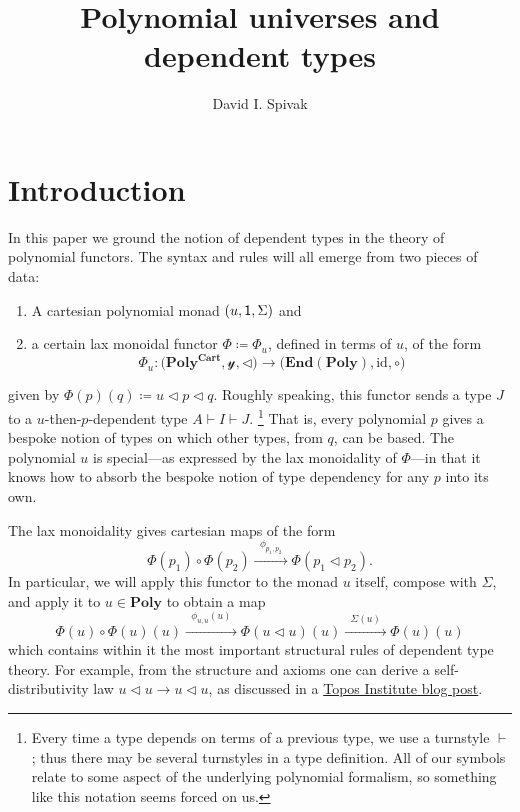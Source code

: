 \documentclass[11pt, one side, article]{memoir}
\theoremstyle{definition}
\theoremstyle{plain}
\newcommand{\Cat}[1]{\mathbf{#1}}%
\newcommand{\id}{\mathrm{id}}
\newcommand{\too}{\longrightarrow}
\newcommand{\Too}[1]{\xrightarrow{\;\;#1\;\;}}
\newcommand{\en}{\Cat{End}}
\newcommand{\yon}{\mathcal{y}}
\newcommand{\poly}{\Cat{Poly}}
\newcommand{\polycart}{\poly^{\Cat{Cart}}}
\newcommand{\0}{\textsf{0}}
\newcommand{\1}{\tn{\textsf{1}}}
\newcommand{\tri}{\mathbin{\triangleleft}}
\begin{document}
\title{Polynomial universes and dependent types}

\author{David I. Spivak}

\date{\vspace{-.2in}}

\maketitle

\begin{abstract}
\end{abstract}


\chapter{Introduction}

In this paper we ground the notion of dependent types in the theory of polynomial functors. The syntax and rules will all emerge from two pieces of data:
\begin{enumerate}
	\item A cartesian polynomial monad $(u,\1,\Sigma)$ and
	\item a certain lax monoidal functor $\Phi\coloneqq\Phi_u$, defined in terms of $u$, of the form
\begin{equation}\label{eqn.Phi}
\Phi_u\colon\Big(\polycart,\yon,\tri\Big)\too\Big(\en(\poly),\id,\circ\Big)
\end{equation}
\end{enumerate}
given by $\Phi(p)(q)\coloneqq u\tri p\tri q$. Roughly speaking, this functor sends a type $J$ to a $u$-then-$p$-dependent type $A\vdash I\vdash J$.%
\footnote{Every time a type depends on terms of a previous type, we use a turnstyle $\vdash$; thus there may be several turnstyles in a type definition. All of our symbols relate to some aspect of the underlying polynomial formalism, so something like this notation seems forced on us.
}
 That is, every polynomial $p$ gives a bespoke notion of types on which other types, from $q$, can be based. The polynomial $u$ is special---as expressed by the lax monoidality of $\Phi$---in that it knows how to absorb the bespoke notion of type dependency for any $p$ into its own. 

The lax monoidality gives cartesian maps of the form 
\[
\Phi(p_1)\circ\Phi(p_2)
\Too{\phi_{p_1,p_2}}
\Phi(p_1\tri p_2).
\]
In particular, we will apply this functor to the monad $u$ itself, compose with $\Sigma$, and apply it to $u\in\poly$ to obtain a map
\begin{equation}\label{eqn.main}
  \Phi(u)\circ\Phi(u)(u)
  \Too{\phi_{u,u}(u)}
  \Phi(u\tri u)(u)
  \Too{\Sigma(u)}
  \Phi(u)(u)
\end{equation}
which contains within it the most important structural rules of dependent type theory. For example, from the structure and axioms one can derive a self-distributivity law $u\tri u\to u\tri u$, as discussed in a \href{https://topos.site/blog/2021/07/jump-monads-from-conjugation-to-dependent-types/}{Topos Institute blog post}.
\end{document}
